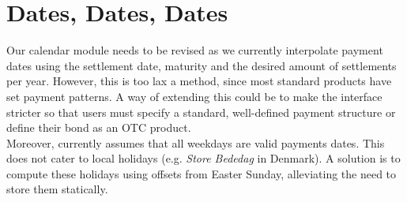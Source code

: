 \section{Dates, Dates, Dates}

Our calendar module needs to be revised as we currently interpolate 
payment dates using the settlement date, maturity and the desired amount of 
settlements per year. However, this is too lax a method, since most standard 
products have set payment patterns. A way of extending this could be to make
the interface stricter so that users must specify a standard, well-defined
payment structure or define their bond as an OTC product.\\

Moreover, \hql currently assumes that all weekdays are valid payments dates. 
This does not cater to local holidays (e.g. \emph{Store Bededag} in Denmark). A 
solution is to compute these holidays using offsets from Easter Sunday, 
alleviating the need to store them statically.\\

